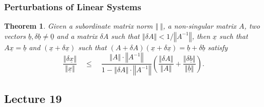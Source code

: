 \documentclass{article}
\newtheorem{theorem}{Theorem}
\begin{document}
\subsubsection{Perturbations of Linear Systems}
\begin{theorem}
    Given a subordinate matrix norm $\left\Vert \ \right\Vert$, a non-singular matrix $A$, two vectors $\underline{b},\delta\underline{b}\neq\underline{0}$ and a matrix $\delta A$ such that $\left\Vert \delta A \right\Vert<1/\left\Vert A^{-1} \right\Vert$, then $\underline{x}$ such that $A\underline{x}=\underline{b}$ and $(\underline{x}+\delta\underline{x})$ such that $(A+\delta A)(\underline{x}+\delta\underline{x}) = \underline{b} + \delta\underline{b}$ satisfy
    \begin{equation}
        \frac{\left\Vert \delta\underline{x} \right\Vert}{\left\Vert \underline{x} \right\Vert}\quad\leq\quad \frac{\left\Vert A \right\Vert\cdot \left\Vert A^{-1} \right\Vert}{1-\left\Vert \delta A \right\Vert\cdot \left\Vert A^{-1} \right\Vert}\left( \frac{\left\Vert \delta A \right\Vert}{\left\Vert A \right\Vert} + \frac{\left\Vert \delta\underline{b} \right\Vert}{\left\Vert \underline{b} \right\Vert} \right).
    \end{equation}
\end{theorem}

\subsection{Lecture 19}
\end{document}
